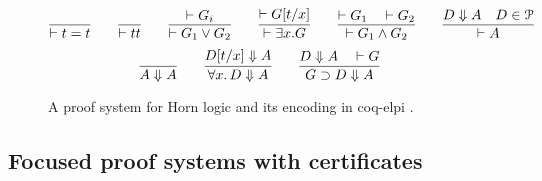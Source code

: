\begin{footnotesize}
  \begin{figure}
  \newcommand{\XXi}{}
  \newcommand{\bc}[2]{#1 \Downarrow #2}
\[
\infer{\XXi\vdash t = t}
{%
}
\qquad
\infer{\XXi\vdash \true}
{%
}
\qquad
\infer{\XXi\vdash G_1\vee G_2}
{\XXi\vdash G_i%
}
\qquad
\infer{\XXi\vdash \exists x. G}
{\XXi\vdash G[t/x]%
}
\qquad 
\infer{\XXi\vdash G_1\wedge G_2}
{\XXi\vdash G_1\quad \XXi\vdash G_2%
}
\qquad
\infer{\XXi\vdash A}
      {\bc D A \quad D \in \Pscr}
\]
\vskip -18pt
\[
  \infer{\bc A A}{}{}\qquad
  \infer{\bc{\forall x.\, D} A}{\bc{D[t/x]} A}{}\qquad
  \infer{\bc{G\supset D} A}{\bc D A\quad \XXi\vdash G}{}
\]

\caption{A proof system for Horn logic and its encoding in coq-elpi .}
\label{fig:interp}
%
%
\end{figure}
\end{footnotesize}


\subsection{Focused proof systems with certificates}
\label{ssec:focused}

